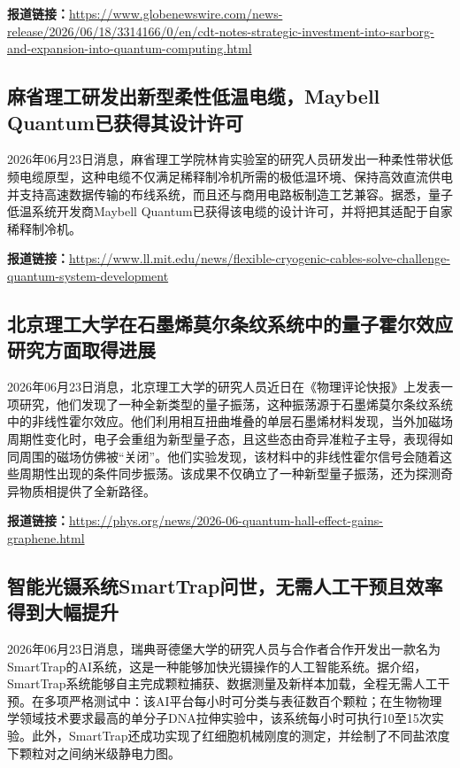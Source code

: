 \documentclass[12pt,a4paper]{ctexart}
\begin{document}
\noindent\textbf{报道链接：}\url{https://www.globenewswire.com/news-release/2026/06/18/3314166/0/en/cdt-notes-strategic-investment-into-sarborg-and-expansion-into-quantum-computing.html}

\subsection{ 麻省理工研发出新型柔性低温电缆，Maybell Quantum已获得其设计许可 }

2026年06月23日消息，麻省理工学院林肯实验室的研究人员研发出一种柔性带状低频电缆原型，这种电缆不仅满足稀释制冷机所需的极低温环境、保持高效直流供电并支持高速数据传输的布线系统，而且还与商用电路板制造工艺兼容。据悉，量子低温系统开发商Maybell Quantum已获得该电缆的设计许可，并将把其适配于自家稀释制冷机。

\noindent\textbf{报道链接：}\url{https://www.ll.mit.edu/news/flexible-cryogenic-cables-solve-challenge-quantum-system-development}

\subsection{ 北京理工大学在石墨烯莫尔条纹系统中的量子霍尔效应研究方面取得进展 }

2026年06月23日消息，北京理工大学的研究人员近日在《物理评论快报》上发表一项研究，他们发现了一种全新类型的量子振荡，这种振荡源于石墨烯莫尔条纹系统中的非线性霍尔效应。他们利用相互扭曲堆叠的单层石墨烯材料发现，当外加磁场周期性变化时，电子会重组为新型量子态，且这些态由奇异准粒子主导，表现得如同周围的磁场仿佛被“关闭”。他们实验发现，该材料中的非线性霍尔信号会随着这些周期性出现的条件同步振荡。该成果不仅确立了一种新型量子振荡，还为探测奇异物质相提供了全新路径。

\noindent\textbf{报道链接：}\url{https://phys.org/news/2026-06-quantum-hall-effect-gains-graphene.html}

\subsection{ 智能光镊系统SmartTrap问世，无需人工干预且效率得到大幅提升 }

2026年06月23日消息，瑞典哥德堡大学的研究人员与合作者合作开发出一款名为SmartTrap的AI系统，这是一种能够加快光镊操作的人工智能系统。据介绍，SmartTrap系统能够自主完成颗粒捕获、数据测量及新样本加载，全程无需人工干预。在多项严格测试中：该AI平台每小时可分类与表征数百个颗粒；在生物物理学领域技术要求最高的单分子DNA拉伸实验中，该系统每小时可执行10至15次实验。此外，SmartTrap还成功实现了红细胞机械刚度的测定，并绘制了不同盐浓度下颗粒对之间纳米级静电力图。
\end{document}
